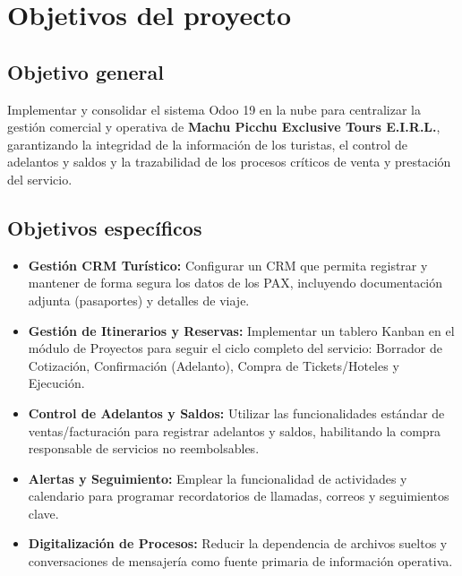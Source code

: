 \section{Objetivos del proyecto}

\subsection{Objetivo general}

Implementar y consolidar el sistema Odoo 19 en la nube para centralizar la gestión comercial y operativa de \textbf{Machu Picchu Exclusive Tours E.I.R.L.}, garantizando la integridad de la información de los turistas, el control de adelantos y saldos y la trazabilidad de los procesos críticos de venta y prestación del servicio.

\subsection{Objetivos específicos}

\begin{itemize}
    \item \textbf{Gestión CRM Turístico:} Configurar un CRM que permita registrar y mantener de forma segura los datos de los PAX, incluyendo documentación adjunta (pasaportes) y detalles de viaje.
    \item \textbf{Gestión de Itinerarios y Reservas:} Implementar un tablero Kanban en el módulo de Proyectos para seguir el ciclo completo del servicio: Borrador de Cotización, Confirmación (Adelanto), Compra de Tickets/Hoteles y Ejecución.
    \item \textbf{Control de Adelantos y Saldos:} Utilizar las funcionalidades estándar de ventas/facturación para registrar adelantos y saldos, habilitando la compra responsable de servicios no reembolsables.
    \item \textbf{Alertas y Seguimiento:} Emplear la funcionalidad de actividades y calendario para programar recordatorios de llamadas, correos y seguimientos clave.
    \item \textbf{Digitalización de Procesos:} Reducir la dependencia de archivos sueltos y conversaciones de mensajería como fuente primaria de información operativa.
\end{itemize}

